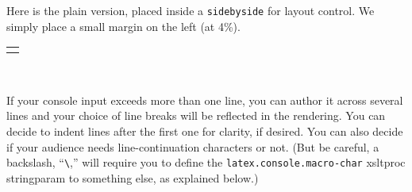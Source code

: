 \documentclass[10pt,]{article}
\theoremstyle{plain}
\theoremstyle{definition}
\theoremstyle{definition}
\theoremstyle{definition}
\theoremstyle{definition}
\theoremstyle{definition}
\theoremstyle{definition}
\numberwithin{equation}{section}
\newenvironment{listing}{\par\bigskip\noindent}{}
\newcommand{\consoleinput}[1]{\textbf{#1}}
\newlength{\panelmax}
\begin{document}
\hypertarget{p-635}{}%
Here is the plain version, placed inside a \lstinline?sidebyside? for layout control.  We simply place a small margin on the left (at 4\%).%
{%
\setlength{\panelmax}{0pt}
\ifdefined\panelboxAconsole\else\newsavebox{\panelboxAconsole}\fi%
\begin{lrbox}{\panelboxAconsole}
\end{lrbox}
\ifdefined\phAconsole\else\newlength{\phAconsole}\fi%
\setlength{\phAconsole}{\ht\panelboxAconsole+\dp\panelboxAconsole}
\settototalheight{\phAconsole}{\usebox{\panelboxAconsole}}
\setlength{\panelmax}{\maxof{\panelmax}{\phAconsole}}
\leavevmode%
\setlength{\tabcolsep}{0\linewidth}
\par\medskip\noindent
\hspace*{0.04\linewidth}%
\begin{tabular}{@{}*{1}{c}@{}}
\begin{minipage}[c][\panelmax][t]{0.92\linewidth}\usebox{\panelboxAconsole}\end{minipage}\end{tabular}\\
}%
\par
\hypertarget{p-636}{}%
If your console input exceeds more than one line, you can author it across several lines and your choice of line breaks will be reflected in the rendering.  You can decide to indent lines after the first one for clarity, if desired.  You can also decide if your audience needs line-continuation characters or not.  (But be careful, a backslash, ``\lstinline?\?,'' will require you to define the \lstinline?latex.console.macro-char? xsltproc stringparam to something else, as explained below.)%
\begin{listing}
\par
{}

\end{listing}
\end{document}
